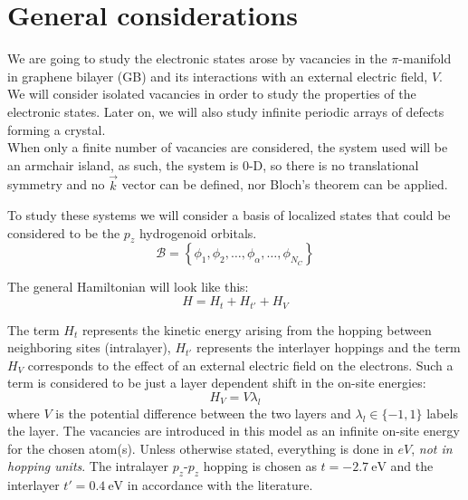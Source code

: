 

\section{General considerations} %
We are going to study the electronic states arose by vacancies in the $\pi$-manifold in graphene bilayer (GB) and its interactions with an external electric field, $V$.
We will consider isolated vacancies in order to study the properties of the electronic states. Later on, we will also study infinite periodic arrays of defects forming a crystal.\\

When only a finite number of vacancies are considered, the system used will be an armchair island, as such, the system is $0$-D, so there is no translational symmetry and no $\vec{k}$ vector can be defined, nor Bloch's theorem can be applied.

To study these systems we will consider a basis of localized states that could be considered to be the $p_z$ hydrogenoid orbitals.
\begin{equation}
  \mathcal{B} = \left\{\phi_1,\phi_2,\dots,\phi_\alpha,\dots,\phi_{N_C}\right\}
\end{equation}

The general Hamiltonian will look like this:
\begin{equation}
  H = H_t + H_{t'} + H_{V}
\label{hamiltonian}
\end{equation}

The term $H_t$ represents the kinetic energy arising from the hopping between neighboring sites (intralayer), $H_{t'}$ represents the interlayer hoppings and the term $H_{V}$ corresponds to the effect of an external electric field on the electrons. Such a term is considered to be just a layer dependent shift in the on-site energies:
\begin{equation}
  H_{V} = V\lambda_l
\end{equation}
where $V$ is the potential difference between the two layers and $\lambda_l\in\{-1,1\}$ labels the layer.
The vacancies are introduced in this model as an infinite on-site energy for the chosen atom(s). Unless otherwise stated, everything is done in $eV$, \emph{not in hopping units}. The intralayer $p_z$-$p_z$ hopping is chosen as $t=\SI{-2.7}{\eV}$ and the interlayer $t'=\SI{0.4}{\eV}$ in accordance with the literature\cite{KatsnelsonBook}.\\

